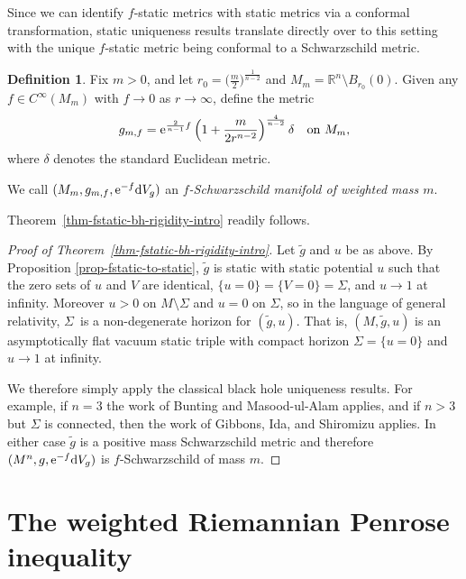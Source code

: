 \documentclass[10pt,a4paper]{amsart}
\numberwithin{equation}{section}
\theoremstyle{definition}
\newtheorem{Definition}[Theorem]{Definition}
\begin{document}
Since we can identify $f$-static metrics with static metrics via a conformal transformation, static uniqueness results translate directly over to this setting with the unique $f$-static metric being conformal to a Schwarzschild metric.


\begin{Definition}\label{def-f-schwarzschild}
	Fix $m>0$, and let $r_0=\big(\frac{m}{2}\big)^{\frac{1}{n-2}}$ and
	$M_m=\mathbb{R}^n\setminus B_{r_0}(0)$.
	Given any $f\in C^\infty(M_m)$ with $f\to 0$ as $r\to\infty$, define the metric
	\[
	g_{m,f}
	={\rm e}^{\frac{2}{n-1}f}\left(1+\frac{m}{2 r^{ n-2}}\right)^{\frac{4}{n-2}}\delta
	\quad\text{on }M_m,
	\]
	where $\delta$ denotes the standard Euclidean metric.
	
	We call $(M_m,g_{m,f},{\rm e}^{-f}{\rm d}V_g)$ an \emph{$f$-Schwarzschild manifold of weighted mass $m$}.
\end{Definition}

Theorem~\ref{thm-fstatic-bh-rigidity-intro} readily follows.

\begin{proof}[Proof of Theorem~\ref{thm-fstatic-bh-rigidity-intro}]
	Let $\widetilde g$ and $u$ be as above. By Proposition \ref{prop-fstatic-to-static}, $\widetilde g$ is static with static potential $u$ such that the zero sets of $u$ and $V$ are identical, $\{u=0\}=\{V=0\}=\Sigma$, and $u\to 1$ at infinity. Moreover $u>0$ on $M\setminus\Sigma$ and $u=0$ on $\Sigma$, so in the language of general relativity, $\Sigma$~is a non-degenerate horizon for $(\widetilde g,u)$. That is, $(M,\widetilde g,u)$ is an asymptotically flat vacuum static triple with compact horizon $\Sigma=\{u=0\}$ and
	$u\to 1$ at infinity.
	
	We therefore simply apply the classical black hole uniqueness results. For example, if $n=3$ the work of Bunting and Masood-ul-Alam \cite{BuntingMasoodUlAlam87} applies, and if $n>3$ but $\Sigma$ is connected, then the work of Gibbons, Ida, and Shiromizu \cite{GibbonsIdaShiromizu02} applies. In either case $\widetilde g$ is a positive mass Schwarzschild metric and therefore $(M^n,g,{\rm e}^{-f}{\rm d}V_g)$ is
	$f$-Schwarzschild of mass $m$.
\end{proof}



\section{The weighted Riemannian Penrose inequality}
\end{document}
